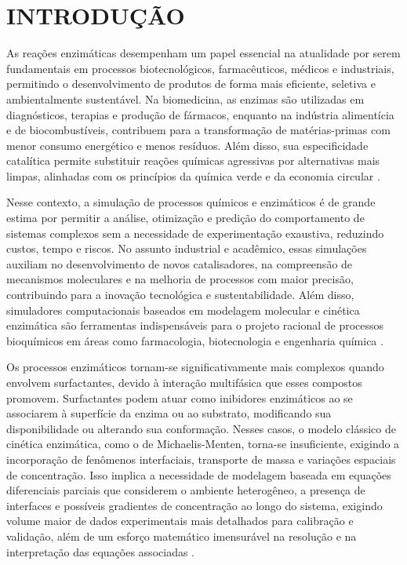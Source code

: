 \documentclass[12pt,oneside]{report}
\begin{document}
\newpage

\tableofcontents
\newpage

\setcounter{page}{1}

\chapter{INTRODUÇÃO}

As reações enzimáticas desempenham um papel essencial na atualidade por serem fundamentais em processos biotecnológicos, farmacêuticos, médicos e industriais, permitindo o desenvolvimento de produtos de forma mais eficiente, seletiva e ambientalmente sustentável. Na biomedicina, as enzimas são utilizadas em diagnósticos, terapias e produção de fármacos, enquanto na indústria alimentícia e de biocombustíveis, contribuem para a transformação de matérias-primas com menor consumo energético e menos resíduos. Além disso, sua especificidade catalítica permite substituir reações químicas agressivas por alternativas mais limpas, alinhadas com os princípios da química verde e da economia circular \cite{nelson2018}.

Nesse contexto, a simulação de processos químicos e enzimáticos é de grande estima por permitir a análise, otimização e predição do comportamento de sistemas complexos sem a necessidade de experimentação exaustiva, reduzindo custos, tempo e riscos. No assunto industrial e acadêmico, essas simulações auxiliam no desenvolvimento de novos catalisadores, na compreensão de mecanismos moleculares e na melhoria de processos com maior precisão, contribuindo para a inovação tecnológica e sustentabilidade. Além disso, simuladores computacionais baseados em modelagem molecular e cinética enzimática são ferramentas indispensáveis para o projeto racional de processos bioquímicos em áreas como farmacologia, biotecnologia e engenharia química \cite{leach2001}.

Os processos enzimáticos tornam-se significativamente mais complexos quando envolvem surfactantes, devido à interação multifásica que esses compostos promovem. Surfactantes podem atuar como inibidores enzimáticos ao se associarem à superfície da enzima ou ao substrato, modificando sua disponibilidade ou alterando sua conformação. Nesses casos, o modelo clássico de cinética enzimática, como o de Michaelis-Menten, torna-se insuficiente, exigindo a incorporação de fenômenos interfaciais, transporte de massa e variações espaciais de concentração. Isso implica a necessidade de modelagem baseada em equações diferenciais parciais que considerem o ambiente heterogêneo, a presença de interfaces e possíveis gradientes de concentração ao longo do sistema, exigindo volume maior de dados experimentais mais detalhados para calibração e validação, além de um esforço matemático imensurável na resolução e na interpretação das equações associadas \cite{vandermeer2001}.
\end{document}
